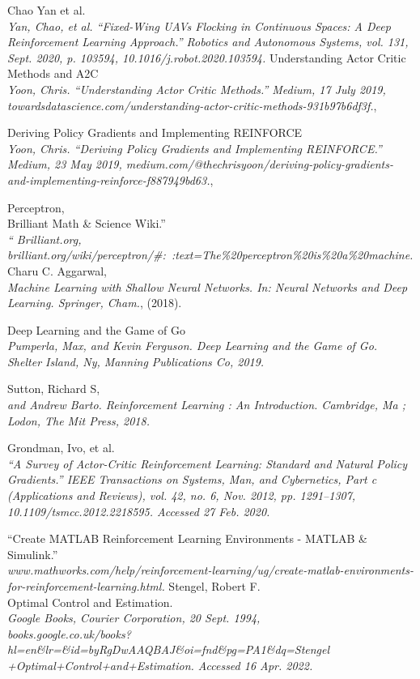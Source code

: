 \begin{thebibliography}{9}
Chao Yan et al.\\
\textit{Yan, Chao, et al. “Fixed-Wing UAVs Flocking in Continuous Spaces: A Deep Reinforcement Learning Approach.” Robotics and Autonomous Systems, vol. 131, Sept. 2020, p. 103594, 10.1016/j.robot.2020.103594.}
Understanding Actor Critic Methods and A2C\\
\textit{Yoon, Chris. “Understanding Actor Critic Methods.” Medium, 17 July 2019,\\ towardsdatascience.com/understanding-actor-critic-methods-931b97b6df3f.},

Deriving Policy Gradients and Implementing REINFORCE\\
\textit{Yoon, Chris. “Deriving Policy Gradients and Implementing REINFORCE.” Medium, 23 May 2019, medium.com/@thechrisyoon/deriving-policy-gradients-and-implementing-reinforce-f887949bd63.},

Perceptron,\\
Brilliant Math \& Science Wiki.”\\
\textit{“ Brilliant.org, brilliant.org/wiki/perceptron/\#:~:text=The\%20perceptron\%20is\%20a\%20machine.}
Charu C. Aggarwal,\\
\textit{Machine Learning with Shallow Neural Networks. In: Neural Networks and Deep Learning. Springer, Cham.},
(2018).

Deep Learning and the Game of Go\\
\textit{Pumperla, Max, and Kevin Ferguson. Deep Learning and the Game of Go. Shelter Island, Ny, Manning Publications Co, 2019.}

Sutton, Richard S,\\
\textit{ and Andrew Barto. Reinforcement Learning : An Introduction. Cambridge, Ma ; Lodon, The Mit Press, 2018.}

Grondman, Ivo, et al.\\
\textit{ “A Survey of Actor-Critic Reinforcement Learning: Standard and Natural Policy Gradients.” IEEE Transactions on Systems, Man, and Cybernetics, Part c (Applications and Reviews), vol. 42, no. 6, Nov. 2012, pp. 1291–1307, 10.1109/tsmcc.2012.2218595. Accessed 27 Feb. 2020.}

“Create MATLAB Reinforcement Learning Environments - MATLAB \& Simulink.”\\
\textit{www.mathworks.com/help/reinforcement-learning/ug/create-matlab-environments-for-reinforcement-learning.html.\hfill}
Stengel, Robert F.\\
Optimal Control and Estimation.\\
\textit{ Google Books, Courier Corporation, 20 Sept. 1994,\\ books.google.co.uk/books?hl=en\&lr=\&id=byRgDwAAQBAJ\&oi=fnd\&pg=PA1\&dq=Stengel\\+Optimal+Control+and+Estimation. Accessed 16 Apr. 2022.}


\end{thebibliography}
